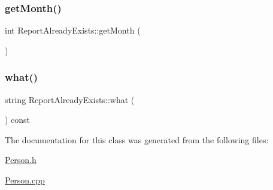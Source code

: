 \subsubsection{\texorpdfstring{get\+Month()}{getMonth()}}
{\footnotesize\ttfamily int Report\+Already\+Exists\+::get\+Month (\begin{DoxyParamCaption}{ }\end{DoxyParamCaption})\hspace{0.3cm}{\ttfamily [inline]}}

\mbox{\label{class_report_already_exists_a66103e5ca6a4b84f3492493b7ced740d}} 
\subsubsection{\texorpdfstring{what()}{what()}}
{\footnotesize\ttfamily string Report\+Already\+Exists\+::what (\begin{DoxyParamCaption}{ }\end{DoxyParamCaption}) const}



The documentation for this class was generated from the following files\+:\begin{DoxyCompactItemize}
\item 
\mbox{\hyperlink{_person_8h}{Person.\+h}}\item 
\mbox{\hyperlink{_person_8cpp}{Person.\+cpp}}\end{DoxyCompactItemize}
